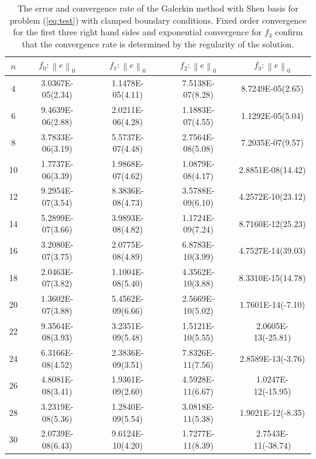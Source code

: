 \documentclass{marine_2015}
\newcommand{\norm}[1]{\ensuremath{\left\|#1\right\|}}
\begin{document}
\begin{table}[t!]
    \begin{center}
    \begin{tabular}{ccccc}
\hline
$n$  &  $f_0: \norm{e}_0$  & $f_1: \norm{e}_0$ & $f_2: \norm{e}_0$ & $f_3: \norm{e}_0$\\
\hline
4 &  3.0367E-05(2.34)& 1.1478E-05(4.11)& 7.5138E-07(8.28)& 8.7249E-05(2.65)  \\ 
6 &  9.4639E-06(2.88)& 2.0211E-06(4.28)& 1.1883E-07(4.55)& 1.1292E-05(5.04) \\
8 &  3.7833E-06(3.19)& 5.5737E-07(4.48)& 2.7564E-08(5.08)& 7.2035E-07(9.57) \\
10&  1.7737E-06(3.39)& 1.9868E-07(4.62)& 1.0879E-08(4.17)& 2.8851E-08(14.42) \\
12&  9.2954E-07(3.54)& 8.3836E-08(4.73)& 3.5788E-09(6.10)& 4.2572E-10(23.12) \\
14&  5.2899E-07(3.66)& 3.9893E-08(4.82)& 1.1724E-09(7.24)& 8.7160E-12(25.23) \\
16&  3.2080E-07(3.75)& 2.0775E-08(4.89)& 6.8783E-10(3.99)& 4.7527E-14(39.03) \\
18&  2.0463E-07(3.82)& 1.1004E-08(5.40)& 4.3562E-10(3.88)& 8.3310E-15(14.78) \\
20&  1.3602E-07(3.88)& 5.4562E-09(6.66)& 2.5669E-10(5.02)& 1.7601E-14(-7.10) \\
22&  9.3564E-08(3.93)& 3.2351E-09(5.48)& 1.5121E-10(5.55)& 2.0605E-13(-25.81)\\
24&  6.3166E-08(4.52)& 2.3836E-09(3.51)& 7.8326E-11(7.56)& 2.8589E-13(-3.76) \\
26&  4.8081E-08(3.41)& 1.9361E-09(2.60)& 4.5928E-11(6.67)& 1.0247E-12(-15.95)\\
28&  3.2319E-08(5.36)& 1.2840E-09(5.54)& 3.0818E-11(5.38)& 1.9021E-12(-8.35) \\
30&  2.0739E-08(6.43)& 9.6124E-10(4.20)& 1.7277E-11(8.39)& 2.7543E-11(-38.74)\\
\hline
    \end{tabular}
    \caption{
    The error and convergence rate of the Galerkin method with Shen basis for
    problem (\ref{eq:test}) with clamped boundary conditions. Fixed order
    convergence for the first three right hand sides and exponential convergence
    for $f_3$ confirm that the convergence rate is determined by the regularity of 
    the solution.
    }
  \label{tab:shen_convergence}
  \end{center}
  \end{table}
\end{document}
